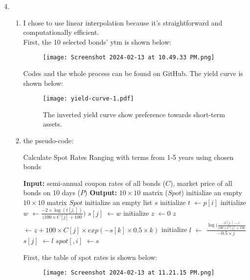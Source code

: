 \documentclass{article}
\begin{document}
\begin{enumerate}
\setcounter{enumi}{3} 
    \item \hfill
    \begin{enumerate}
        \item  
        I chose to use linear interpolation because it's straightforward and computationally efficient.
        \\ First, the 10 selected bonds' ytm is shown below:
        \newpage
        \begin{figure}[h]
            \centering
            \texttt{[image: Screenshot 2024-02-13 at 10.49.33 PM.png]}
        \end{figure}
        Codes and the whole process can be found on GitHub. The yield curve is shown below:
        \begin{figure}[h]
            \centering
            \texttt{[image: yield-curve-1.pdf]}
            \caption{The inverted yield curve show preference towards short-term assets.}
        \end{figure}
        
        
        \item the pseudo-code:
        \begin{algorithm}[H]
        \caption{Calculate Spot Rates Ranging with terms from 1-5 years using chosen bonds }
            \begin{algorithmic}[1]
                \State\textbf{Input:} semi-annual coupon rates of all bonds ($C$), market price of all bonds on 10 days ($P$)
                \State \textbf{Output:} $10 \times 10$ matrix ($Spot$)
                \State initialize an empty $10 \times 10$ matrix $Spot$
                \State initialize an empty list $s$
                \State initialize $t$ $\gets p[i]$
                \State initialize $w$ $\gets \frac{-2 \times \log(t[j,])}{(100 \times C[j] + 100})$
                \State $s[j]$ $\gets w$
                \Else 
                \State initialize $z$ $\gets 0$
                \State $z$ $\gets z + 100 \times C[j] \times exp(-s[k]\times 0.5\times k)$
                \EndFor
                \State initialize $l$ $\gets$ $\frac{\log(\frac{(t[j,]-z}{100 \times C[j] + 100}}{-0.5 \times j}$
                \State $s[j]$ $\gets l$
                \EndIf
                \EndFor
                \State $spot[,i]$ $\gets s$
                \EndFor
            \end{algorithmic}            
        \end{algorithm}
        First, the table of spot rates is shown below:
        \begin{figure}[h]
            \centering
            \texttt{[image: Screenshot 2024-02-13 at 11.21.15 PM.png]}   
        \end{figure}
        

\end{enumerate}
\end{enumerate}
\end{document}
